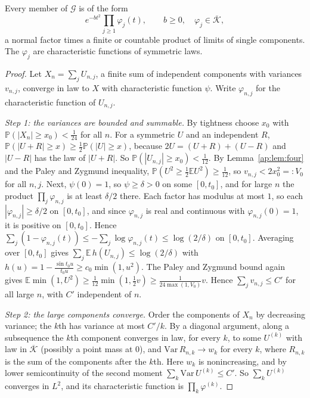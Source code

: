\begin{theorem}\label{ap:thm:closure}
Every member of $\mathcal G$ is of the form
\[
e^{-bt^2}\prod_{j\ge1}\varphi_j(t),\qquad b\ge0,\quad\varphi_j\in\overline{\mathcal K},
\]
a normal factor times a finite or countable product of limits of single components. The $\varphi_j$ are characteristic functions of symmetric laws.
\end{theorem}

\begin{proof}
Let $X_n=\sum_jU_{n,j}$, a finite sum of independent components with variances $v_{n,j}$, converge in law to $X$ with characteristic function $\psi$. Write $\varphi_{n,j}$ for the characteristic function of $U_{n,j}$.

\emph{Step 1: the variances are bounded and summable.} By tightness choose $x_0$ with $\mathbb P(|X_n|\ge x_0)<\frac1{24}$ for all $n$. For a symmetric $U$ and an independent $R$, $\mathbb P(|U+R|\ge x)\ge\frac12\mathbb P(|U|\ge x)$, because $2U=(U+R)+(U-R)$ and $|U-R|$ has the law of $|U+R|$. So $\mathbb P(|U_{n,j}|\ge x_0)<\frac1{12}$. By Lemma~\ref{ap:lem:four} and the Paley and Zygmund inequality, $\mathbb P(U^2\ge\frac12\mathbb E U^2)\ge\frac1{12}$, so $v_{n,j}<2x_0^2=:V_0$ for all $n,j$. Next, $\psi(0)=1$, so $\psi\ge\delta>0$ on some $[0,t_0]$, and for large $n$ the product $\prod_j\varphi_{n,j}$ is at least $\delta/2$ there. Each factor has modulus at most $1$, so each $|\varphi_{n,j}|\ge\delta/2$ on $[0,t_0]$, and since $\varphi_{n,j}$ is real and continuous with $\varphi_{n,j}(0)=1$, it is positive on $[0,t_0]$. Hence $\sum_j(1-\varphi_{n,j}(t))\le-\sum_j\log\varphi_{n,j}(t)\le\log(2/\delta)$ on $[0,t_0]$. Averaging over $[0,t_0]$ gives $\sum_j\mathbb E\,h(U_{n,j})\le\log(2/\delta)$ with $h(u)=1-\frac{\sin t_0u}{t_0u}\ge c_0\min(1,u^2)$. The Paley and Zygmund bound again gives $\mathbb E\min(1,U^2)\ge\frac1{12}\min(1,\frac12v)\ge\frac1{24\max(1,V_0)}v$. Hence $\sum_jv_{n,j}\le C'$ for all large $n$, with $C'$ independent of $n$.

\emph{Step 2: the large components converge.} Order the components of $X_n$ by decreasing variance; the $k$th has variance at most $C'/k$. By a diagonal argument, along a subsequence the $k$th component converges in law, for every $k$, to some $U^{(k)}$ with law in $\overline{\mathcal K}$ (possibly a point mass at $0$), and $\mathrm{Var}\,R_{n,k}\to w_k$ for every $k$, where $R_{n,k}$ is the sum of the components after the $k$th. Here $w_k$ is nonincreasing, and by lower semicontinuity of the second moment $\sum_k\mathrm{Var}\,U^{(k)}\le C'$. So $\sum_kU^{(k)}$ converges in $L^2$, and its characteristic function is $\prod_k\varphi^{(k)}$.


\end{proof}
